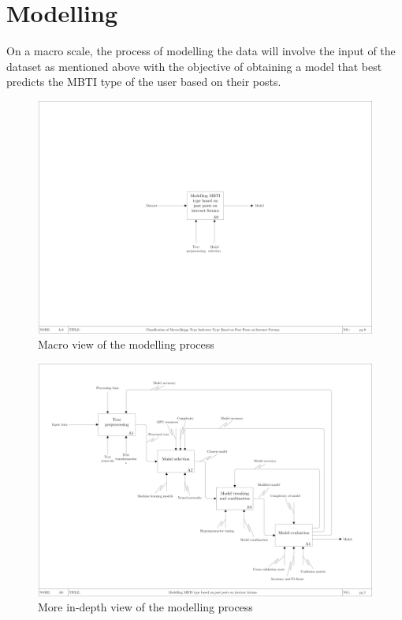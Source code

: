 \documentclass[11pt,a4paper]{article}
\begin{document}
	\clearpage
	
	\section{Modelling}
	
	On a macro scale, the process of modelling the data will involve the input of the dataset as mentioned above with the objective of obtaining a model that best predicts the MBTI type of the user based on their posts.
	
	\begin{figure}[h!]
		\centering
		
		\includegraphics[width=\textwidth]{img/CDS0}
		
		\caption{Macro view of the modelling process}
		
	\end{figure}

	
	\begin{figure}[h!]
		\centering
		
		\includegraphics[width=\textwidth]{img/CDS}
		
		\caption{More in-depth view of the modelling process}
		
	\end{figure}
	
\end{document}
